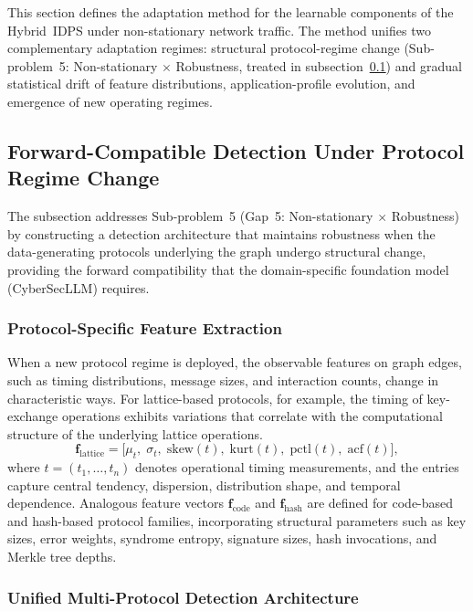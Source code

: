 This section defines the adaptation method for the learnable components of the Hybrid~IDPS under non-stationary network traffic. The method unifies two complementary adaptation regimes: structural protocol-regime change (Sub-problem~5: Non-stationary $\times$ Robustness, treated in subsection~\ref{sec:pq_idps}) and gradual statistical drift of feature distributions, application-profile evolution, and emergence of new operating regimes.

\subsection{Forward-Compatible Detection Under Protocol Regime Change}
\label{sec:pq_idps}

The subsection addresses Sub-problem~5 (Gap~5: Non-stationary $\times$ Robustness) by constructing a detection architecture that maintains robustness when the data-generating protocols underlying the graph undergo structural change, providing the forward compatibility that the domain-specific foundation model (CyberSecLLM) requires.

\subsubsection{Protocol-Specific Feature Extraction}

When a new protocol regime is deployed, the observable features on graph edges, such as timing distributions, message sizes, and interaction counts, change in characteristic ways. For lattice-based protocols, for example, the timing of key-exchange operations exhibits variations that correlate with the computational structure of the underlying lattice operations.\begin{equation}
\mathbf{f}_{\mathrm{lattice}}
= \bigl[\mu_t,\;\sigma_t,\;\mathrm{skew}(t),\;\mathrm{kurt}(t),\;
  \mathrm{pctl}(t),\;\mathrm{acf}(t)\bigr],
\label{eq:pq_feat_lattice}
\end{equation}
where $t=(t_1,\dots,t_n)$ denotes operational timing measurements, and the entries capture central tendency, dispersion, distribution shape, and temporal dependence. Analogous feature vectors $\mathbf{f}_{\mathrm{code}}$ and $\mathbf{f}_{\mathrm{hash}}$ are defined for code-based and hash-based protocol families, incorporating structural parameters such as key sizes, error weights, syndrome entropy, signature sizes, hash invocations, and Merkle tree depths.

\subsubsection{Unified Multi-Protocol Detection Architecture}

